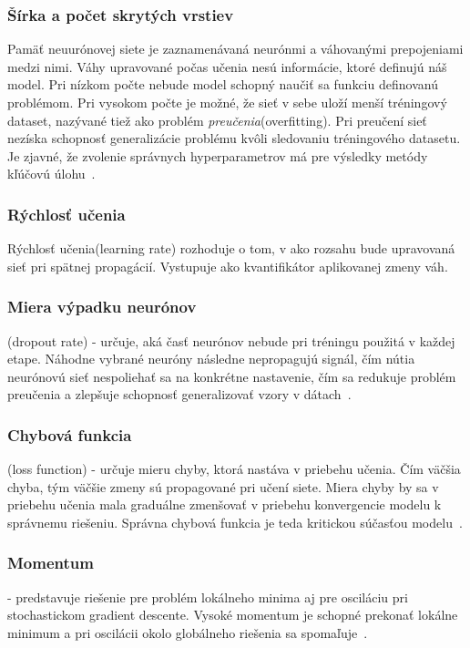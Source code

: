 \subsubsection*{Šírka a počet skrytých vrstiev} Pamäť neuurónovej siete je zaznamenávaná neurónmi a váhovanými prepojeniami medzi nimi. Váhy upravované počas učenia nesú informácie, ktoré definujú náš model. Pri nízkom počte nebude model schopný naučiť sa funkciu definovanú problémom. Pri vysokom počte je možné, že sieť v sebe uloží menší tréningový dataset, nazývané tiež ako problém \textit{preučenia}(overfitting). Pri preučení sieť nezíska schopnosť generalizácie problému kvôli sledovaniu tréningového datasetu. Je zjavné, že zvolenie správnych hyperparametrov má pre výsledky metódy kľúčovú úlohu~\cite{Goodfellow-et-al-2016-Book}.

\subsubsection*{Rýchlosť učenia} 
Rýchlosť učenia(learning rate) rozhoduje o tom, v ako rozsahu bude upravovaná sieť pri spätnej propagácií. Vystupuje ako kvantifikátor aplikovanej zmeny váh.

\subsubsection*{Miera výpadku neurónov}(dropout rate) - určuje, aká časť neurónov nebude pri tréningu použitá v každej etape. Náhodne vybrané neuróny následne nepropagujú signál, čím nútia neurónovú sieť nespoliehať sa na konkrétne nastavenie, čím sa redukuje problém preučenia a zlepšuje schopnosť generalizovať vzory v dátach~\cite{srivastava2014dropout}.
\subsubsection*{Chybová funkcia}(loss function) - určuje mieru chyby, ktorá nastáva v priebehu učenia. Čím väčšia chyba, tým väčšie zmeny sú propagované pri učení siete. Miera chyby by sa v priebehu učenia mala graduálne zmenšovať v priebehu konvergencie modelu k správnemu riešeniu. Správna chybová funkcia je teda kritickou súčasťou modelu~\cite{christoffersen2004importance}.
\subsubsection*{Momentum} - predstavuje riešenie pre problém lokálneho minima aj pre osciláciu pri stochastickom gradient descente. Vysoké momentum je schopné prekonať lokálne minimum a pri oscilácii okolo globálneho riešenia sa spomaľuje~\cite{attoh1999analysis}.

